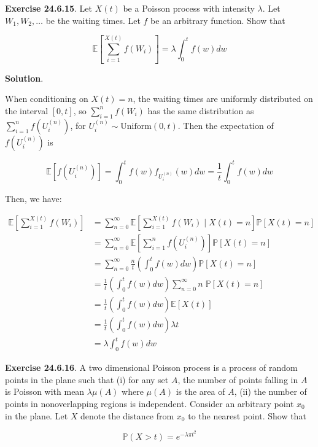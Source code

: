 \textbf{Exercise 24.6.15}. Let \(X(t)\) be a Poisson process with
intensity \(\lambda\). Let \(W_{1}, W_{2}, \dots\) be the waiting times. Let
\(f\) be an arbitrary function. Show that

\[ \mathbb{E} \left[ \sum_{i=1}^{X(t)} f(W_{i}) \right] = \lambda \int_{0}^t f(w) dw \]

\textbf{Solution}.

When conditioning on \(X(t) = n\), the waiting times are uniformly
distributed on the interval \([0, t]\), so \(\sum_{i=1}^{n} f(W_{i})\) has
the same distribution as \(\sum_{i=1}^{n} f\left(U_{i}^{(n)}\right)\), for
\(U_{i}^{(n)} \sim \text{Uniform}(0, t)\). Then the expectation of
\(f\left(U_{i}^{(n)}\right)\) is

\[\mathbb{E}\left[ f\left(U_{i}^{(n)}\right) \right] = \int_{0}^t f(w) f_{U_{i}^{(n)}}(w) dw = \frac{1}{t} \int_{0}^t f(w) dw\]

Then, we have:

\begin{align*}
\mathbb{E}\left[ \sum_{i=1}^{X(t)} f(W_{i}) \right] 
&= \sum_{n = 0}^{\infty} \mathbb{E}\left[ \sum_{i=1}^{X(t)} f(W_{i}) \; \Bigg| \; X(t) = n\right] \mathbb{P} \left[ X(t) = n \right] \\
&= \sum_{n = 0}^{\infty} \mathbb{E}\left[ \sum_{i=1}^{n} f\left(U_{i}^{(n)}\right) \right] \mathbb{P} \left[ X(t) = n \right] \\
&= \sum_{n = 0}^{\infty} \frac{n}{t} \left( \int_{0}^t f(w) dw \right) \mathbb{P} \left[ X(t) = n \right] \\
&= \frac{1}{t} \left( \int_{0}^t f(w) dw \right) \sum_{n=0}^{\infty} n \; \mathbb{P} \left[ X(t) = n \right] \\
&= \frac{1}{t} \left( \int_{0}^t f(w) dw \right) \mathbb{E} \left[ X(t) \right] \\
&= \frac{1}{t} \left( \int_{0}^t f(w) dw \right) \lambda t \\
&= \lambda \int_{0}^t f(w) dw
\end{align*}

\textbf{Exercise 24.6.16}. A two dimensional Poisson process is a
process of random points in the plane such that (i) for any set \(A\),
the number of points falling in \(A\) is Poisson with mean
\(\lambda \mu(A)\) where \(\mu(A)\) is the area of \(A\), (ii) the
number of points in nonoverlapping regions is independent. Consider an
arbitrary point \(x_{0}\) in the plane. Let \(X\) denote the distance from
\(x_{0}\) to the nearest point. Show that

\[ \mathbb{P}(X > t) = e^{-\lambda \pi t^{2}} \]

